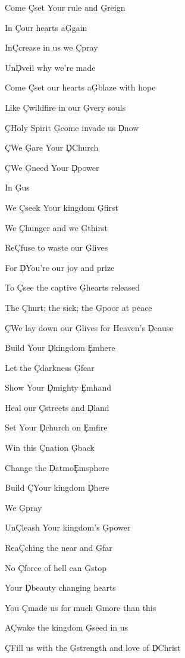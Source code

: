 \documentclass[9pt]{extarticle}
\begin{document}
\bsong

\bv
Come \c{C}set Your rule and \c{G}reign

In \c{C}our hearts a\c{G}gain

In\c{C}crease in us we \c{C}pray

Un\c{D}veil why we're made

Come \c{C}set our hearts a\c{G}blaze with hope

Like \c{C}wildfire in our \c{G}very souls

\c{C}Holy Spirit \c{G}come invade us \c{D}now
\ev

\bp
\c{C}We \c{G}are Your \c{D}Church

\c{C}We \c{G}need Your \c{D}power

In \c{G}us
\ep

\bv
We \c{C}seek Your kingdom \c{G}first

We \c{C}hunger and we \c{G}thirst

Re\c{C}fuse to waste our \c{G}lives

For \c{D}You're our joy and prize

To \c{C}see the captive \c{G}hearts released

The \c{C}hurt; the sick; the \c{G}poor at peace

\c{C}We lay down our \c{G}lives for Heaven's \c{D}cause
\ev


\bc
Build Your \c{D}kingdom \c{Em}here

Let the \c{C}darkness \c{G}fear

Show Your \c{D}mighty \c{Em}hand

Heal our \c{C}streets and \c{D}land

Set Your \c{D}church on \c{Em}fire

Win this \c{C}nation \c{G}back

Change the \c{D}atmo\c{Em}sphere

Build \c{C}Your kingdom \c{D}here

We \c{G}pray
\ec

\bv
Un\c{C}leash Your kingdom's \c{G}power

Rea\c{C}ching the near and \c{G}far

No \c{C}force of hell can \c{G}stop

Your \c{D}beauty changing hearts

You \c{C}made us for much \c{G}more than this

A\c{C}wake the kingdom \c{G}seed in us

\c{C}Fill us with the \c{G}strength and love of \c{D}Christ
\ev



\esong
\end{document}
